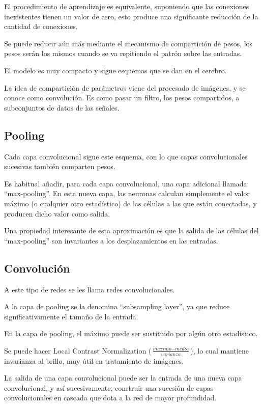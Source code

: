 \documentclass[12pt, twoside, openright]{report} %
\begin{document}
El procedimiento de aprendizaje es equivalente, suponiendo que las conexiones inexistentes tienen un valor de cero, esto produce una significante reducción de la cantidad de conexiones.

Se puede reducir aún más mediante el mecanismo de compartición de pesos, los pesos serán los mismos cuando se va repitiendo el patrón sobre las entradas. 

El modelo es muy compacto y sigue esquemas que se dan en el cerebro.

La idea de compartición de parámetros viene del procesado de imágenes, y se conoce como convolución. Es como pasar un filtro, los pesos compartidos, a subconjuntos de datos de las señales.

\subsection{Pooling}
Cada capa convolucional sigue este esquema, con lo que capas convolucionales sucesivas también comparten pesos.

Es habitual añadir, para cada capa convolucional, una capa adicional llamada “max-pooling”. En esta nueva capa, las neuronas calculan simplemente el valor máximo (o cualquier otro estadístico) de las células a las que están conectadas, y producen dicho valor como salida.

Una propiedad interesante de esta aproximación es que la salida de las células del “max-pooling” son invariantes a los desplazamientos en las entradas.

\subsection{Convolución}
A este tipo de redes se les llama redes convolucionales.

A la capa de pooling se la denomina “subsampling layer”, ya que reduce significativamente el tamaño de la entrada.

En la capa de pooling, el máximo puede ser sustituido por algún otro estadístico.

Se puede hacer Local Contrast Normalization ($\frac{\textit{maximo}-\textit{media}}{\textit{varianza}}$), lo cual mantiene invarianza al brillo, muy útil en tratamiento de imágenes.

La salida de una capa convolucional puede ser la entrada de una nueva capa convolucional, y así sucesivamente, construir una sucesión de capas convolucionales en cascada que dota a la red de mayor profundidad.
\end{document}
